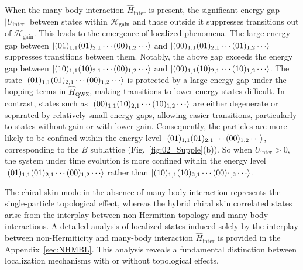 \documentclass[longbibliography, aps, prx, amsmath, amssymb, amsfonts, twocolumn,superscriptaddress, footinbib]{revtex4-1}
\begin{document}
	When the many-body interaction $\hat{H}_{\text{inter}}$ is present, the significant energy gap $\vert U_{\text{inter}} \vert$ between states within $\mathscr{H}_{\text{gain}}$ and those outside it suppresses transitions out of $\mathscr{H}_{\text{gain}}$. This leads to the emergence of localized phenomena. 
	The large energy gap between $\ket{(01)_{1,1}(01)_{2,1}\cdots(00)_{1,2}\cdots}$ and $\ket{(00)_{1,1}(01)_{2,1}\cdots(01)_{1,2}\cdots}$ suppresses transitions between them. 
	Notably, the above gap exceeds the energy gap between $\ket{(10)_{1,1}(10)_{2,1}\cdots(00)_{1,2}\cdots}$ and $\ket{(00)_{1,1}(10)_{2,1}\cdots(10)_{1,2}\cdots}$.
	The state $\ket{(01)_{1,1}(01)_{2,1}\cdots(00)_{1,2}\cdots}$ is protected by a large energy gap under the hopping terms in $\hat{H}_{\text{QWZ}}$, making transitions to lower-energy states difficult. In contrast, states such as $\ket{(00)_{1,1}(10)_{2,1}\cdots(10)_{1,2}\cdots}$ are either degenerate or separated by relatively small energy gaps, allowing easier transitions, particularly to states without gain or with lower gain.
	Consequently, the particles are more likely to be confined within the energy level 
	$\ket{(01)_{1,1}(01)_{2,1}\cdots(00)_{1,2}\cdots}$,
	 corresponding to the $B$ sublattice (Fig.~\ref{fig:02_Supple}(b)). 
	So when $U_{\text{inter}}>0$, the system under time evolution 
	is more confined within the energy level 
	$\ket{(01)_{1,1}(01)_{2,1}\cdots(00)_{1,2}\cdots}$ rather than $\ket{(10)_{1,1}(10)_{2,1}\cdots(00)_{1,2}\cdots}$.

	The chiral skin mode in the absence of many-body interaction represents the single-particle topological effect, whereas the hybrid chiral skin correlated states arise from the interplay between non-Hermitian topology and many-body interactions. A detailed analysis of localized states induced solely by the interplay between non-Hermiticity and many-body interaction $\hat{H}_{\text{inter}}$ is provided in the Appendix~\ref{sec:NHMBL}.
	This analysis reveals a fundamental distinction between localization mechanisms with or without topological effects.
\end{document}
